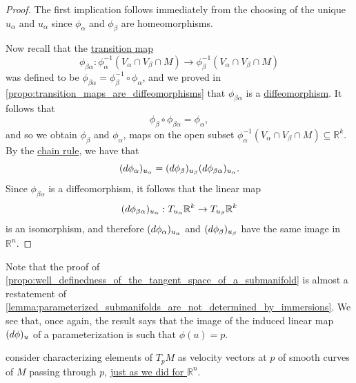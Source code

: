 \documentclass[notoc,notitlepage]{tufte-book}
\begin{document}
\begin{proof}
  The first implication follows immediately from the choosing of the unique
  $u_\alpha$ and $u_\alpha$ since $\phi_\alpha$ and $\phi_\beta$ are
  homeomorphisms.

  Now recall that the \hyperref[defn:transition_map]{transition map}
  \begin{equation*}
    \phi_{\beta \alpha} : \phi_{\alpha}^{-1} (V_\alpha \cap V_\beta \cap M) \to
    \phi_{\beta}^{-1} (V_\alpha \cap V_\beta \cap M)
  \end{equation*}
  was defined to be $\phi_{\beta \alpha} = \phi_{\beta}^{-1} \circ
  \phi_{\alpha}$, and we proved in
  \cref{propo:transition_maps_are_diffeomorphisms} that $\phi_{\beta \alpha}$ is
  a \hyperref[defn:diffeomorphism]{diffeomorphism}. It follows that
  \begin{equation*}
    \phi_{\beta} \circ \phi_{\beta \alpha} = \phi_{\alpha},
  \end{equation*}
  and so we obtain $\phi_\beta$ and $\phi_\alpha$, maps on the open subset
  $\phi_{\alpha}^{-1} (V_\alpha \cap V_\beta \cap M) \subseteq \mathbb{R}^k$. By
  the \hyperref[thm:the_chain_rule]{chain rule}, we have that
  \begin{equation*}
    (\mathop{}\!d{\phi_\alpha})_{u_\alpha} = (\mathop{}\!d{\phi_\beta})_{u_\beta}
    (\mathop{}\!d{\phi_{\beta \alpha}})_{u_\alpha}.
  \end{equation*}
  Since $\phi_{\beta \alpha}$ is a diffeomorphism, it follows that the linear map
  \begin{equation*}
    (\mathop{}\!d{\phi_{\beta \alpha}})_{u_\alpha} : T_{u_\alpha} \mathbb{R}^k \to
    T_{u_\beta} \mathbb{R}^k
  \end{equation*}
  is an isomorphism, and therefore $(\mathop{}\!d{\phi_{\alpha}})_{u_\alpha}$ and
  $(\mathop{}\!d{\phi_\beta})_{u_\beta}$ have the same image in $\mathbb{R}^n$.
\end{proof}

\begin{note}
  Note that the proof of
  \cref{propo:well_definedness_of_the_tangent_space_of_a_submanifold} is almost
  a restatement of
  \cref{lemma:parameterized_submanifolds_are_not_determined_by_immersions}. We
  see that, once again, the result says that the image of the induced linear map
  $(\mathop{}\!d{\phi})_u$ of a parameterization is  such that $\phi(u) = p$.
\end{note}

 consider characterizing elements of $T_p M$ as velocity
vectors at $p$ of smooth curves of $M$ passing through $p$,
\hyperref[sec:smooth_curves_in_r_n_and_tangent_vectors_continued]{just as we did
for $\mathbb{R}^n$}.
\end{document}
